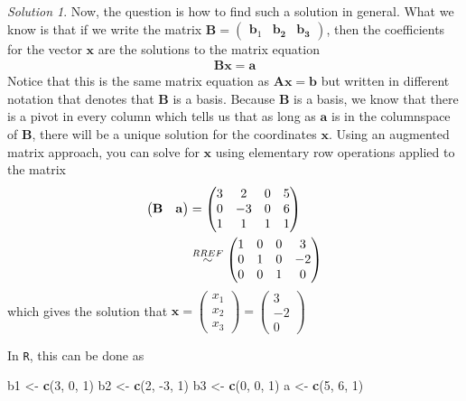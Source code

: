 \documentclass[
]{book}
\newenvironment{Shaded}{\begin{snugshade}}{\end{snugshade}}
\newcommand{\DecValTok}[1]{\textcolor[rgb]{0.00,0.00,0.81}{#1}}
\newcommand{\KeywordTok}[1]{\textcolor[rgb]{0.13,0.29,0.53}{\textbf{#1}}}
\newcommand{\NormalTok}[1]{#1}
\newcommand{\StringTok}[1]{\textcolor[rgb]{0.31,0.60,0.02}{#1}}
\theoremstyle{definition}
\theoremstyle{definition}
\theoremstyle{definition}
\theoremstyle{remark}
\newtheorem*{solution}{Solution}
\begin{document}
\begin{solution}
Now, the question is how to find such a solution in general. What we know is that if we write the matrix \(\mathbf{B} = \begin{pmatrix} \mathbf{b}_1 & \mathbf{b_2} & \mathbf{b_3} \end{pmatrix}\), then the coefficients for the vector \(\mathbf{x}\) are the solutions to the matrix equation
\[
\begin{aligned}
\mathbf{B} \mathbf{x} = \mathbf{a}
\end{aligned}
\]
Notice that this is the same matrix equation as \(\mathbf{A} \mathbf{x} = \mathbf{b}\) but written in different notation that denotes that \(\mathbf{B}\) is a basis. Because \(\mathbf{B}\) is a basis, we know that there is a pivot in every column which tells us that as long as \(\mathbf{a}\) is in the columnspace of \(\mathbf{B}\), there will be a unique solution for the coordinates \(\mathbf{x}\). Using an augmented matrix approach, you can solve for \(\mathbf{x}\) using elementary row operations applied to the matrix
\[
\begin{aligned}
\begin{pmatrix} \mathbf{B} & \mathbf{a} \end{pmatrix} & = \begin{pmatrix} 3 & 2 & 0 & 5 \\ 0 & -3 & 0 & 6 \\ 1 & 1 & 1 & 1 \end{pmatrix} \\
& \stackrel{RREF}{\huge \sim} \begin{pmatrix} 1 & 0 & 0 & 3 \\ 0 & 1 & 0 & -2 \\ 0 & 0 & 1 & 0 \end{pmatrix} 
\end{aligned}
\]
which gives the solution that \(\mathbf{x} = \begin{pmatrix} x_1 \\ x_ 2 \\ x_3 \end{pmatrix} = \begin{pmatrix} 3 \\ -2 \\ 0\end{pmatrix}\)

In \texttt{R}, this can be done as

\begin{Shaded}
\begin{Highlighting}[]
\NormalTok{b1 <-}\StringTok{ }\KeywordTok{c}\NormalTok{(}\DecValTok{3}\NormalTok{, }\DecValTok{0}\NormalTok{, }\DecValTok{1}\NormalTok{)}
\NormalTok{b2 <-}\StringTok{ }\KeywordTok{c}\NormalTok{(}\DecValTok{2}\NormalTok{, }\DecValTok{-3}\NormalTok{, }\DecValTok{1}\NormalTok{)}
\NormalTok{b3 <-}\StringTok{ }\KeywordTok{c}\NormalTok{(}\DecValTok{0}\NormalTok{, }\DecValTok{0}\NormalTok{, }\DecValTok{1}\NormalTok{)}
\NormalTok{a <-}\StringTok{ }\KeywordTok{c}\NormalTok{(}\DecValTok{5}\NormalTok{, }\DecValTok{6}\NormalTok{, }\DecValTok{1}\NormalTok{)}


\end{Highlighting}
\end{Shaded}
\end{solution}
\end{document}

